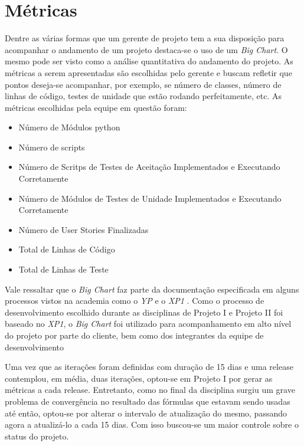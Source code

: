 \chapter{Métricas}

Dentre as várias formas que um gerente de projeto tem a sua disposição para acompanhar o andamento de um projeto destaca-se o uso de um \textit{Big Chart}. O mesmo pode ser visto como a análise quantitativa do andamento do projeto. As métricas a serem apresentadas são escolhidas pelo gerente e buscam refletir que pontos deseja-se acompanhar, por exemplo, se número de classes, número de linhas de código, testes de unidade que estão rodando perfeitamente, etc. As métricas escolhidas pela equipe em questão foram:

\begin{itemize}
 \item Número de Módulos python
 \item Número de scripts
 \item Número de Scritps de Testes de Aceitação Implementados e Executando Corretamente
 \item Número de Módulos de Testes de Unidade Implementados e Executando Corretamente
 \item Número de User Stories Finalizadas
 \item Total de Linhas de Código
 \item Total de Linhas de Teste
\end{itemize}


Vale ressaltar que o \textit{Big Chart} faz parte da documentação especificada em alguns processos vistos na academia como o \textit{YP} \cite{yp} e o \textit{XP1} \cite{xp1}. Como o processo de desenvolvimento escolhido durante as disciplinas de Projeto I e Projeto II foi baseado no \textit{XP1}, o \textit{Big Chart} foi utilizado para acompanhamento em alto nível do projeto por parte do cliente, bem como dos integrantes da equipe de desenvolvimento

Uma vez que as iterações foram definidas com duração de 15 dias e uma release contemplou, em média, duas iterações, optou-se em Projeto I por gerar as métricas a cada release. Entretanto, como no final da disciplina surgiu um grave problema de convergência no resultado das fórmulas que estavam sendo usadas até então, optou-se por alterar o intervalo de atualização do mesmo, passando agora a atualizá-lo a cada 15 dias. Com isso buscou-se um maior controle sobre o status do projeto.

